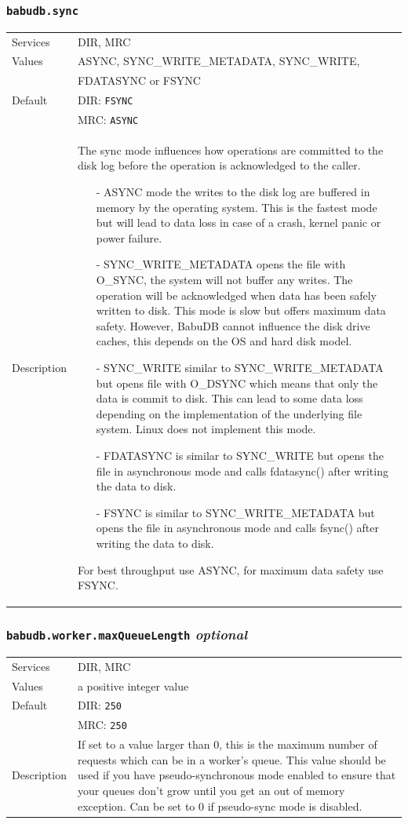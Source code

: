 \documentclass[a4paper,10pt]{book}
\begin{document}
\subsubsection{\texttt{babudb.sync}}
\begin{tabular}{lp{10cm}}
 Services & DIR, MRC\\
 Values   & ASYNC, SYNC\_WRITE\_METADATA, SYNC\_WRITE,\\ 
	      & FDATASYNC or FSYNC\\
 Default  & DIR: \texttt{FSYNC}\\
          & MRC: \texttt{ASYNC}\\
 Description & The sync mode influences how operations are committed to the disk log before the operation is acknowledged to the caller.
\begin{itemize}
 \item[-]ASYNC mode the writes to the disk log are buffered in memory by the operating system. This is the fastest mode but will lead to data loss in case of a crash, kernel panic or power failure.
 \item[-]SYNC\_WRITE\_METADATA opens the file with O\_SYNC, the system will not buffer any writes. The operation will be acknowledged when data has been safely written to disk. This mode is slow but offers maximum data safety. However, BabuDB cannot influence the disk drive caches, this depends on the OS and hard disk model.
 \item[-]SYNC\_WRITE similar to SYNC\_WRITE\_METADATA but opens file with O\_DSYNC which means that only the data is commit to disk. This can lead to some data loss depending on the implementation of the underlying file system. Linux does not implement this mode.
 \item[-]FDATASYNC is similar to SYNC\_WRITE but opens the file in asynchronous mode and calls fdatasync() after writing the data to disk.
 \item[-]FSYNC is similar to SYNC\_WRITE\_METADATA but opens the file in asynchronous mode and calls fsync() after writing the data to disk.
\end{itemize}
For best throughput use ASYNC, for maximum data safety use FSYNC. 
\end{tabular} 

\subsubsection{\texttt{babudb.worker.maxQueueLength} \textit{optional}}
\begin{tabular}{lp{10cm}}
 Services & DIR, MRC\\
 Values   & a positive integer value\\
 Default  & DIR: \texttt{250}\\
          & MRC: \texttt{250}\\
 Description & If set to a value larger than 0, this is the maximum number of requests which can be in a worker's queue. This value should be used if you have pseudo-synchronous mode enabled to ensure that your queues don't grow until you get an out of memory exception. Can be set to 0 if pseudo-sync mode is disabled. 
\end{tabular}
\end{document}

